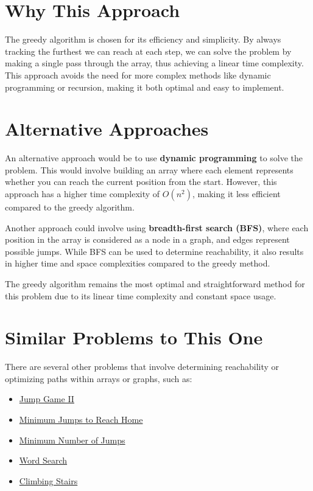 \section*{Why This Approach}

The greedy algorithm is chosen for its efficiency and simplicity. By always tracking the furthest we can reach at each step, we can solve the problem by making a single pass through the array, thus achieving a linear time complexity. This approach avoids the need for more complex methods like dynamic programming or recursion, making it both optimal and easy to implement.

\section*{Alternative Approaches}

An alternative approach would be to use \textbf{dynamic programming} to solve the problem. This would involve building an array where each element represents whether you can reach the current position from the start. However, this approach has a higher time complexity of \(O(n^2)\), making it less efficient compared to the greedy algorithm.

Another approach could involve using \textbf{breadth-first search (BFS)}, where each position in the array is considered as a node in a graph, and edges represent possible jumps. While BFS can be used to determine reachability, it also results in higher time and space complexities compared to the greedy method.

The greedy algorithm remains the most optimal and straightforward method for this problem due to its linear time complexity and constant space usage.

\section*{Similar Problems to This One}

There are several other problems that involve determining reachability or optimizing paths within arrays or graphs, such as:

\begin{itemize}
    \item \hyperref[problem:jump_game_ii]{Jump Game II}
    \item \hyperref[problem:minimum_jumps_to_reach_home]{Minimum Jumps to Reach Home}
    \item \hyperref[problem:minimum_number_of_jumps]{Minimum Number of Jumps}
    \item \hyperref[problem:word_search]{Word Search}
    \item \hyperref[problem:climbing_stairs]{Climbing Stairs}
\end{itemize}

